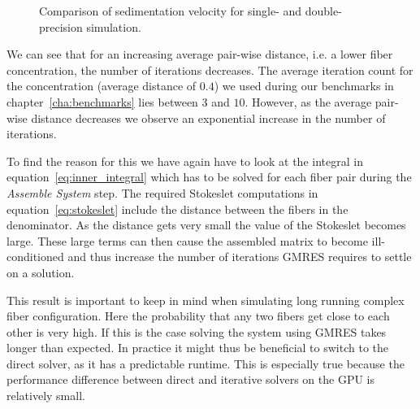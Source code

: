 \documentclass[a4paper,11pt]{kth-mag}
\begin{document}
\begin{figure}[!htbp]
  \centering
  \caption{Comparison of sedimentation velocity for single- and double-precision simulation.}
  \label{fig:concentration_gmres}
\end{figure}

We can see that for an increasing average pair-wise distance, i.e. a lower fiber concentration, the number of iterations decreases. The average iteration count for the concentration (average distance of $0.4$) we used during our benchmarks in chapter~\ref{cha:benchmarks} lies between $3$ and $10$. However, as the average pair-wise distance decreases we observe an exponential increase in the number of iterations.

To find the reason for this we have again have to look at the integral in equation~\eqref{eq:inner_integral} which has to be solved for each fiber pair during the \emph{Assemble System} step. The required Stokeslet computations in equation~\eqref{eq:stokeslet} include the distance between the fibers in the denominator. As the distance gets very small the value of the Stokeslet becomes large. These large terms can then cause the assembled matrix to become ill-conditioned and thus increase the number of iterations GMRES requires to settle on a solution.

This result is important to keep in mind when simulating long running complex fiber configuration. Here the probability that any two fibers get close to each other is very high. If this is the case solving the system using GMRES takes longer than expected. In practice it might thus be beneficial to switch to the direct solver, as it has a predictable runtime. This is especially true because the performance difference between direct and iterative solvers on the GPU is relatively small.
\end{document}
